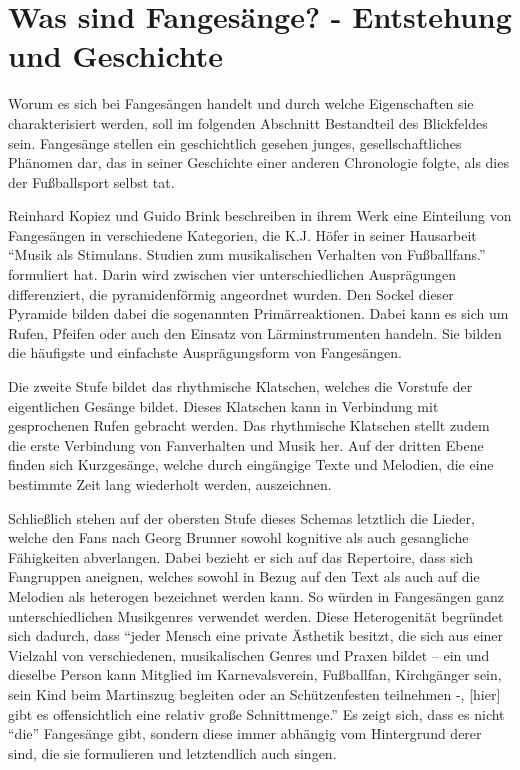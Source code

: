 \section{Was sind Fangesänge? - Entstehung und Geschichte}
Worum es sich bei Fangesängen handelt und durch welche Eigenschaften sie charakterisiert werden, soll im folgenden Abschnitt Bestandteil des Blickfeldes sein.
Fangesänge stellen ein geschichtlich gesehen junges, gesellschaftliches Phänomen dar, das in seiner Geschichte einer anderen Chronologie folgte, als dies der Fußballsport selbst tat.

Reinhard Kopiez und Guido Brink beschreiben in ihrem Werk eine Einteilung von Fangesängen in verschiedene Kategorien, die K.J. Höfer in seiner Hausarbeit "`Musik als Stimulans. Studien zum musikalischen Verhalten von Fußballfans."'\cite[S. 15]{RK98} formuliert hat.
Darin wird zwischen vier unterschiedlichen Ausprägungen differenziert, die pyramidenförmig angeordnet wurden.
Den Sockel dieser Pyramide bilden dabei die sogenannten Primärreaktionen.
Dabei kann es sich um Rufen, Pfeifen oder auch den Einsatz von Lärminstrumenten handeln.
Sie bilden die häufigste und einfachste Ausprägungsform von Fangesängen.

Die zweite Stufe bildet das rhythmische Klatschen, welches die Vorstufe der eigentlichen Gesänge bildet.
Dieses Klatschen kann in Verbindung mit gesprochenen Rufen gebracht werden.\cite[S. 196]{AB08}
Das rhythmische Klatschen stellt zudem die erste Verbindung von Fanverhalten und Musik her.
Auf der dritten Ebene finden sich Kurzgesänge, welche durch eingängige Texte und Melodien, die eine bestimmte Zeit lang wiederholt werden, auszeichnen.

Schließlich stehen auf der obersten Stufe dieses Schemas letztlich die Lieder, welche den Fans nach Georg Brunner sowohl kognitive als auch gesangliche Fähigkeiten abverlangen.
Dabei bezieht er sich auf das Repertoire, dass sich Fangruppen aneignen, welches sowohl in Bezug auf den Text als auch auf die Melodien als heterogen bezeichnet werden kann.
So würden in Fangesängen ganz unterschiedlichen Musikgenres verwendet werden.\cite[S. 197]{AB08}
Diese Heterogenität begründet sich dadurch, dass "`jeder Mensch eine private Ästhetik besitzt, die sich aus einer Vielzahl von verschiedenen, musikalischen Genres und Praxen bildet – ein und dieselbe Person kann Mitglied im Karnevalsverein, Fußballfan, Kirchgänger sein, sein Kind beim Martinszug begleiten oder an Schützenfesten teilnehmen -, [hier] gibt es offensichtlich eine relativ große Schnittmenge."'\cite[S.197]{AB08}
Es zeigt sich, dass es nicht "`die"' Fangesänge gibt, sondern diese immer abhängig vom Hintergrund derer sind, die sie formulieren und letztendlich auch singen.

